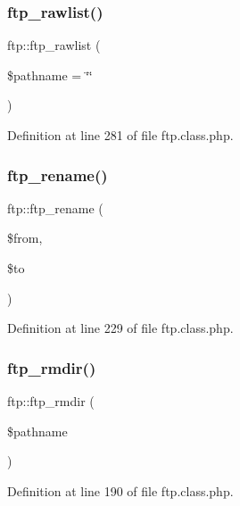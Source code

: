 \mbox{\label{classftp_a67e63d6ca3a1b9d6d633b020f1ff6d05}} 
\subsubsection{\texorpdfstring{ftp\+\_\+rawlist()}{ftp\_rawlist()}}
{\footnotesize\ttfamily ftp\+::ftp\+\_\+rawlist (\begin{DoxyParamCaption}\item[{}]{\$pathname = {\ttfamily \char`\"{}\char`\"{}} }\end{DoxyParamCaption})}



Definition at line 281 of file ftp.\+class.\+php.

\mbox{\label{classftp_a967cb22d8ccb9b5493cc46b32956c10f}} 
\subsubsection{\texorpdfstring{ftp\+\_\+rename()}{ftp\_rename()}}
{\footnotesize\ttfamily ftp\+::ftp\+\_\+rename (\begin{DoxyParamCaption}\item[{}]{\$from,  }\item[{}]{\$to }\end{DoxyParamCaption})}



Definition at line 229 of file ftp.\+class.\+php.

\mbox{\label{classftp_ad3b2c9cca8a01e60b4bbe1b6fa347057}} 
\subsubsection{\texorpdfstring{ftp\+\_\+rmdir()}{ftp\_rmdir()}}
{\footnotesize\ttfamily ftp\+::ftp\+\_\+rmdir (\begin{DoxyParamCaption}\item[{}]{\$pathname }\end{DoxyParamCaption})}



Definition at line 190 of file ftp.\+class.\+php.

